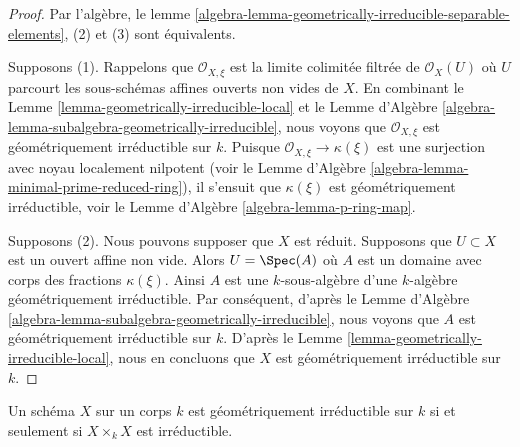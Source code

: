 \begin{proof}
Par l'algèbre, le lemme
\ref{algebra-lemma-geometrically-irreducible-separable-elements},
(2) et (3) sont équivalents.

\medskip\noindent
Supposons (1). Rappelons que $\mathcal{O}_{X, \xi}$ est
la limite colimitée filtrée de $\mathcal{O}_X(U)$ où $U$
parcourt les sous-schémas affines ouverts non vides de
$X$. En combinant le Lemme
\ref{lemma-geometrically-irreducible-local} et le Lemme
d'Algèbre
\ref{algebra-lemma-subalgebra-geometrically-irreducible}, nous voyons
que $\mathcal{O}_{X, \xi}$ est géométriquement irréductible sur $k$.
Puisque $\mathcal{O}_{X, \xi} \to \kappa(\xi)$ est une surjection avec
noyau localement nilpotent (voir le Lemme d'Algèbre
\ref{algebra-lemma-minimal-prime-reduced-ring}), il s'ensuit que $\kappa(\xi)$ est
géométriquement irréductible, voir le Lemme d'Algèbre \ref{algebra-lemma-p-ring-map}.

\medskip\noindent
Supposons (2). Nous pouvons supposer que $X$ est réduit. Supposons que
$U \subset X$ est un ouvert affine non vide. Alors $U = \Spec(A)$ où $A$
est un domaine avec corps des fractions $\kappa(\xi)$. Ainsi $A$ est
une $k$-sous-algèbre d'une $k$-algèbre géométriquement irréductible. Par
conséquent, d'après le Lemme d'Algèbre
\ref{algebra-lemma-subalgebra-geometrically-irreducible}, nous voyons que $A$ est
géométriquement irréductible sur $k$. D'après le Lemme
\ref{lemma-geometrically-irreducible-local}, nous en concluons que $X$ est géométriquement irréductible sur $k$.
\end{proof}

\begin{lemma}
\label{lemma-geometrically-irreducible-self-product}
Un schéma $X$ sur un corps $k$ est géométriquement
irréductible sur $k$ si et seulement si $X\times_k X$ est irréductible.
\end{lemma}

